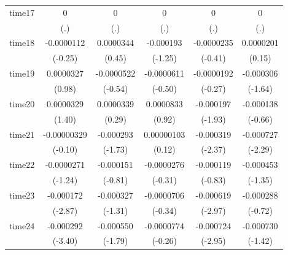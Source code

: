 \begin{table}[htbp]
\begin{tabular}{l*{5}{c}}
time17      &           0         &           0         &           0         &           0         &           0         \\
            &         (.)         &         (.)         &         (.)         &         (.)         &         (.)         \\
time18      &  -0.0000112         &   0.0000344         &   -0.000193         &  -0.0000235         &   0.0000201         \\
            &     (-0.25)         &      (0.45)         &     (-1.25)         &     (-0.41)         &      (0.15)         \\
time19      &   0.0000327         &  -0.0000522         &  -0.0000611         &  -0.0000192         &   -0.000306         \\
            &      (0.98)         &     (-0.54)         &     (-0.50)         &     (-0.27)         &     (-1.64)         \\
time20      &   0.0000329         &   0.0000339         &   0.0000833         &   -0.000197         &   -0.000138         \\
            &      (1.40)         &      (0.29)         &      (0.92)         &     (-1.93)         &     (-0.66)         \\
time21      & -0.00000329         &   -0.000293         &  0.00000103         &   -0.000319\sym{*}  &   -0.000727\sym{*}  \\
            &     (-0.10)         &     (-1.73)         &      (0.12)         &     (-2.37)         &     (-2.29)         \\
time22      &  -0.0000271         &   -0.000151         &  -0.0000276         &   -0.000119         &   -0.000453         \\
            &     (-1.24)         &     (-0.81)         &     (-0.31)         &     (-0.83)         &     (-1.35)         \\
time23      &   -0.000172\sym{**} &   -0.000327         &  -0.0000706         &   -0.000619\sym{**} &   -0.000288         \\
            &     (-2.87)         &     (-1.31)         &     (-0.34)         &     (-2.97)         &     (-0.72)         \\
time24      &   -0.000292\sym{***}&   -0.000550         &  -0.0000774         &   -0.000724\sym{**} &   -0.000730         \\
            &     (-3.40)         &     (-1.79)         &     (-0.26)         &     (-2.95)         &     (-1.42)         \\

\end{tabular}
\end{table}
